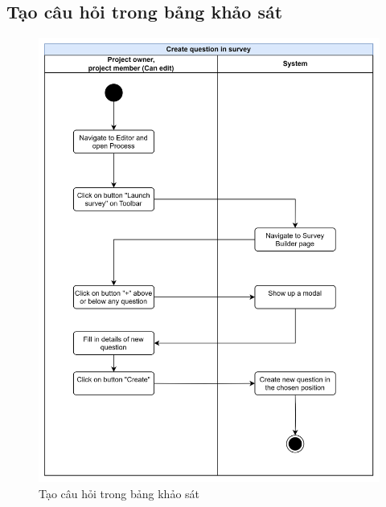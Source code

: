 \subsection{Tạo câu hỏi trong bảng khảo sát}
\begin{figure}[H]
    \centering
    \includegraphics[width=0.8\linewidth]{Content/Phân tích và thiết kế hệ thống/documents/Sơ đồ hoạt động/images/createQuestionInSurvey.png}
    \vspace{0.5cm}
    \caption{Tạo câu hỏi trong bảng khảo sát}
    \label{fig:Tạo câu hỏi trong bảng khảo sát}
\end{figure}